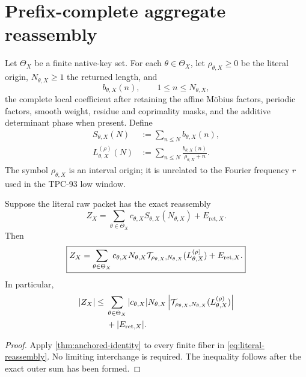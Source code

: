 \section{Prefix-complete aggregate reassembly}
\label{sec:aggregate}

Let \(\Theta_X\) be a finite native-key set.  For each
\(\theta\in\Theta_X\), let \(\rho_{\theta,X}\ge0\) be the literal
origin, \(N_{\theta,X}\ge1\) the returned length, and
\[
 b_{\theta,X}(n),\qquad 1\le n\le N_{\theta,X},
\]
the complete local coefficient after retaining the affine M\"obius
factors, periodic factors, smooth weight, residue and coprimality
masks, and the additive determinant phase when present.  Define
\begin{align}
 S_{\theta,X}(N)
 &:=
 \sum_{n\le N}b_{\theta,X}(n),
 \label{eq:fiber-sum}\\
 L_{\theta,X}^{(\rho)}(N)
 &:=
 \sum_{n\le N}
 \frac{b_{\theta,X}(n)}{\rho_{\theta,X}+n}.
\label{eq:fiber-anchored-primitive}
\end{align}
The symbol \(\rho_{\theta,X}\) is an interval origin; it is unrelated
to the Fourier frequency \(r\) used in the TPC-93 low window.

\begin{theorem}
\label{thm:aggregate-identity}
Suppose the literal raw packet has the exact reassembly
\begin{equation}
 Z_X=
 \sum_{\theta\in\Theta_X}
 c_{\theta,X}
 S_{\theta,X}(N_{\theta,X})
 +E_{\mathrm{ret},X}.
\label{eq:literal-reassembly}
\end{equation}
Then
\begin{equation}
 \boxed{
 Z_X=
 \sum_{\theta\in\Theta_X}
 c_{\theta,X}N_{\theta,X}
 \mathcal T_{\rho_{\theta,X},N_{\theta,X}}
 (L_{\theta,X}^{(\rho)})
 +E_{\mathrm{ret},X}.}
\label{eq:aggregate-signed}
\end{equation}
In particular,
\begin{align}
 |Z_X|
 \le{}&
 \sum_{\theta\in\Theta_X}
 |c_{\theta,X}|N_{\theta,X}
 \left|
 \mathcal T_{\rho_{\theta,X},N_{\theta,X}}
 (L_{\theta,X}^{(\rho)})
 \right|
 \notag\\
 &+|E_{\mathrm{ret},X}|.
\label{eq:aggregate-absolute}
\end{align}
\end{theorem}

\begin{proof}
Apply \cref{thm:anchored-identity} to every finite fiber in
\eqref{eq:literal-reassembly}.  No limiting interchange is required.
The inequality follows after the exact outer sum has been formed.
\end{proof}

